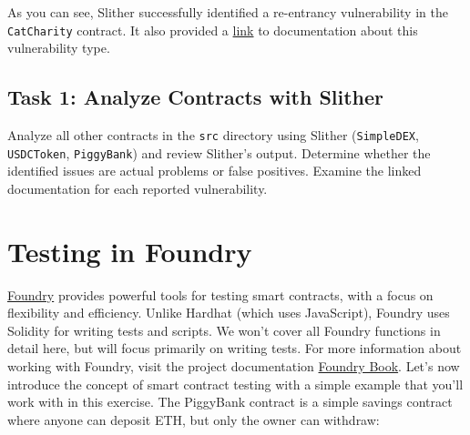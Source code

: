 \documentclass[12pt]{article}
\begin{document}
As you can see, Slither successfully identified a re-entrancy vulnerability in
the \texttt{CatCharity} contract. It also provided a
\href{https://github.com/crytic/slither/wiki/Detector-Documentation#reentrancy-vulnerabilities}{link}
to documentation about this vulnerability type.

\subsection*{Task 1: Analyze Contracts with Slither}
Analyze all other contracts in the \texttt{src} directory using Slither
(\texttt{SimpleDEX}, \texttt{USDCToken}, \texttt{PiggyBank}) and review
Slither's output. Determine whether the identified issues are actual problems
or false positives. Examine the linked documentation for each reported
vulnerability.







\section{Testing in Foundry}

\href{https://github.com/foundry-rs/foundry}{Foundry} provides powerful tools for testing smart contracts, with a focus on flexibility and efficiency. Unlike Hardhat (which uses JavaScript), Foundry uses Solidity for writing tests and scripts. We won't cover all Foundry functions in detail here, but will focus primarily on writing tests. For more information about working with Foundry, visit the project documentation \href{https://book.getfoundry.sh/}{Foundry Book}. Let's now introduce the concept of smart contract testing with a simple example that you'll work with in this exercise. The PiggyBank contract is a simple savings contract where anyone can deposit ETH, but only the owner can withdraw:
\end{document}
